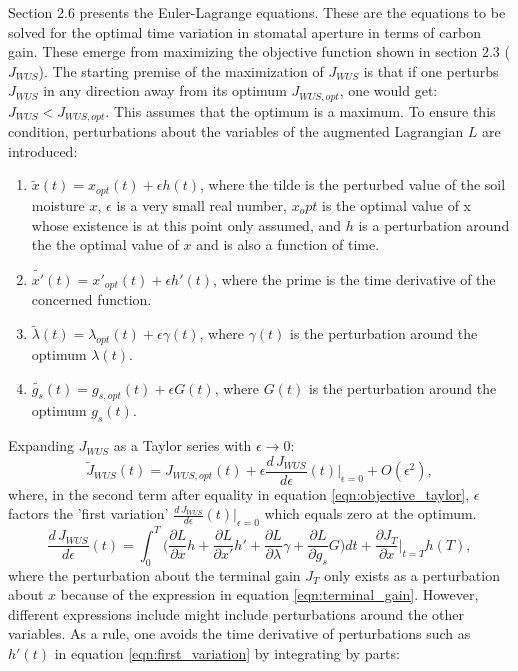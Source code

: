 \documentclass[utf8]{frontiersSCNS} %
\begin{document}
Section 2.6 presents the Euler-Lagrange equations. These are the equations to be solved for the optimal time variation in stomatal aperture in terms of carbon gain. These emerge from maximizing the objective function shown in section 2.3 ($J_{WUS}$). The starting premise of the maximization of $J_{WUS}$ is that if one perturbs $J_{WUS}$ in any direction away from its optimum $J_{WUS,opt}$, one would get: $J_{WUS} < J_{WUS,opt}$. This assumes that the optimum is a maximum. To ensure this condition, perturbations about the variables of the augmented Lagrangian $L$ are introduced:
\begin{enumerate}
    \item $\widetilde{x}(t) = x_{opt}(t) + \epsilon h(t)$, where the tilde is the perturbed value of the soil moisture $x$, $\epsilon$ is a very small real number, $x_opt$ is the optimal value of x whose existence is at this point only assumed, and $h$ is a perturbation around the the optimal value of $x$ and is also a function of time.
    \item $\widetilde{x'}(t) = x'_{opt}(t) + \epsilon h'(t)$, where the prime is the time derivative of the concerned function.
    \item $\widetilde{\lambda}(t) = \lambda_{opt}(t) + \epsilon \gamma(t)$, where $\gamma(t)$ is the perturbation around the optimum $\lambda(t)$.
    \item $\widetilde{g_s}(t) = g_{s,opt}(t) + \epsilon G(t)$, where $G(t)$ is the perturbation around the optimum $g_s(t)$.
\end{enumerate}
Expanding $J_{WUS}$ as a Taylor series with $\epsilon \rightarrow 0$:
\begin{equation}
    \label{eqn:objective_taylor}
    \widetilde{J}_{WUS}(t) = J_{WUS,opt}(t) + \epsilon \frac{d\, J_{WUS}}{d \epsilon}(t) |_{\epsilon = 0} + O(\epsilon^2),
\end{equation}
where, in the second term after equality in equation \ref{eqn:objective_taylor}, $\epsilon$ factors the 'first variation' $\frac{d\, J_{WUS}}{d \epsilon}(t) |_{\epsilon = 0}$ which equals zero at the optimum.
\begin{equation}
    \label{eqn:first_variation}
    \frac{d\, J_{WUS}}{d \epsilon}(t) = \int_0^T \Big(\frac{\partial L}{\partial x} h + \frac{\partial L}{\partial x'} h' + \frac{\partial L}{\partial \lambda} \gamma + \frac{\partial L}{\partial g_s} G \Big) dt + \frac{\partial J_T}{\partial x}|_{t=T} h(T),
\end{equation}
where the perturbation about the terminal gain $J_T$ only exists as a perturbation about $x$ because of the expression in equation \ref{eqn:terminal_gain}. However, different expressions include might include perturbations around the other variables. As a rule, one avoids the time derivative of perturbations such as $h'(t)$ in equation \ref{eqn:first_variation} by integrating by parts:
\end{document}
